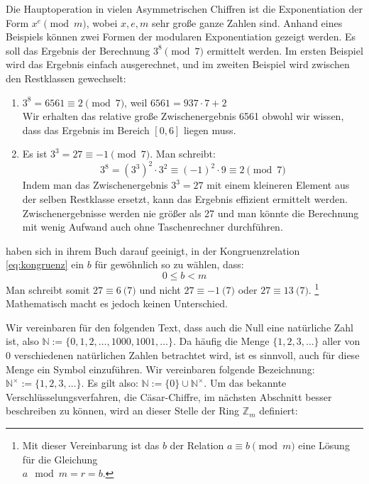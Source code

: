 \begin{example}
  Die Hauptoperation in vielen Asymmetrischen Chiffren ist die Exponentiation der Form
  $x^e \pmod{m}$, wobei $x,e,m$ sehr große ganze Zahlen sind. Anhand eines Beispiels können
  zwei Formen der modularen Exponentiation gezeigt werden. Es soll das Ergebnis der
  Berechnung $3^8 \pmod{7}$ ermittelt werden. Im ersten Beispiel wird das Ergebnis einfach
  ausgerechnet, und im zweiten Beispiel wird zwischen den Restklassen gewechselt:
  \begin{enumerate}
    \item $3^8 = 6561 \equiv 2 \pmod{7}$, weil $6561 = 937 \cdot 7 + 2$ \\
          Wir erhalten das relative große Zwischenergebnis 6561 obwohl wir wissen,
          dass das Ergebnis im Bereich $[0, 6]$ liegen muss.
    \item Es ist $3^3 = 27 \equiv -1 \pmod{7}$. Man schreibt:
          \begin{equation*}
            3^8 = (3^3)^2 \cdot 3^2 \equiv (-1)^2 \cdot 9 \equiv 2 \pmod{7}
          \end{equation*}
          Indem man das Zwischenergebnis $3^3 = 27$ mit einem kleineren Element aus der selben
          Restklasse ersetzt, kann das Ergebnis effizient ermittelt werden. Zwischenergebnisse
          werden nie größer als 27 und man könnte die Berechnung mit wenig Aufwand auch ohne
          Taschenrechner durchführen.
  \end{enumerate}
\end{example}

\begin{remark}
  \citeauthor{BOOK:crypto} \parencite*[16]{BOOK:crypto} haben sich in ihrem Buch darauf geeinigt,
  in der Kongruenzrelation \eqref{eq:kongruenz} ein $b$ für gewöhnlich
  so zu wählen, dass:
  \begin{equation*}
    0 \leq b < m
  \end{equation*}
  Man schreibt somit $27 \equiv 6 \pod{7}$ und nicht $27 \equiv -1 \pod{7}$
  oder $27 \equiv 13 \pod{7}$. \footnote{Mit dieser Vereinbarung ist das $b$ der Relation
    $a \equiv b \pmod{m}$ eine Lösung für die Gleichung \\ $a \mod{m} = r = b$.}
  Mathematisch macht es jedoch keinen Unterschied.
\end{remark}
\noindent
Wir vereinbaren für den folgenden Text, dass auch die Null eine natürliche Zahl ist,
also $\mathbb{N} := \{0,1,2,\dots, 1000, 1001, \dots\}$. Da häufig die Menge
$\{1,2,3,\dots\}$ aller von 0 verschiedenen natürlichen Zahlen betrachtet wird, ist
es sinnvoll, auch für diese Menge ein Symbol einzuführen. Wir vereinbaren folgende
Bezeichnung: $\mathbb{N}^\times := \{1,2,3,\dots\}$.
Es gilt also: $\mathbb{N} := \{0\} \cup \mathbb{N}^\times$.
Um das bekannte Verschlüsselungsverfahren, die Cäsar-Chiffre, im nächsten Abschnitt
besser beschreiben zu können, wird an dieser Stelle der Ring $\mathbb{Z}_m$ definiert:

